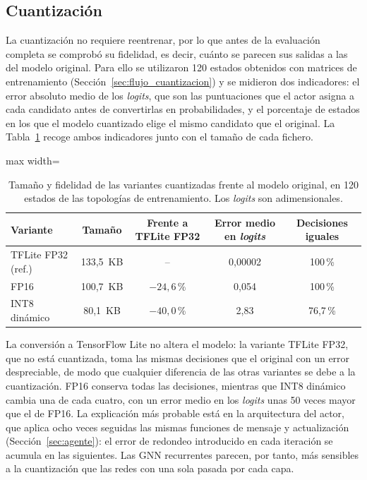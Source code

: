 \subsection{Cuantización}\label{sec:res_cuantizacion}

La cuantización no requiere reentrenar, por lo que antes de la evaluación completa se comprobó su fidelidad, es decir, cuánto se parecen sus salidas a las del modelo original. Para ello se utilizaron 120 estados obtenidos con matrices de entrenamiento (Sección~\ref{sec:flujo_cuantizacion}) y se midieron dos indicadores: el error absoluto medio de los \textit{logits}, que son las puntuaciones que el actor asigna a cada candidato antes de convertirlas en probabilidades, y el porcentaje de estados en los que el modelo cuantizado elige el mismo candidato que el original. La Tabla~\ref{tab:res_cuantizacion} recoge ambos indicadores junto con el tamaño de cada fichero.

\begin{table}[H]
	\centering
	\footnotesize
	\begin{adjustbox}{max width=\textwidth}
	\begin{tabular}{lcccc}
		\toprule
		\textbf{Variante} & \textbf{Tamaño} & \textbf{Frente a TFLite FP32} & \textbf{Error medio en \textit{logits}} & \textbf{Decisiones iguales} \\
		\midrule
		TFLite FP32 (ref.) & 133,5~KB & -- & 0,00002 & 100\,\% \\
		FP16 & 100,7~KB & $-24{,}6$\,\% & 0,054 & 100\,\% \\
		INT8 dinámico & 80,1~KB & $-40{,}0$\,\% & 2,83 & 76,7\,\% \\
		\bottomrule
	\end{tabular}
	\end{adjustbox}
	\caption[Tamaño y fidelidad de las variantes cuantizadas]{Tamaño y fidelidad de las variantes cuantizadas frente al modelo original, en 120 estados de las topologías de entrenamiento. Los \textit{logits} son adimensionales.}
	\label{tab:res_cuantizacion}
\end{table}

La conversión a TensorFlow Lite no altera el modelo: la variante TFLite FP32, que no está cuantizada, toma las mismas decisiones que el original con un error despreciable, de modo que cualquier diferencia de las otras variantes se debe a la cuantización. FP16 conserva todas las decisiones, mientras que INT8 dinámico cambia una de cada cuatro, con un error medio en los \textit{logits} unas 50 veces mayor que el de FP16. La explicación más probable está en la arquitectura del actor, que aplica ocho veces seguidas las mismas funciones de mensaje y actualización (Sección~\ref{sec:agente}): el error de redondeo introducido en cada iteración se acumula en las siguientes. Las GNN recurrentes parecen, por tanto, más sensibles a la cuantización que las redes con una sola pasada por cada capa.

